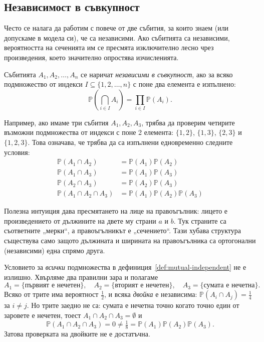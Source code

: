 \subsection{Независимост в съвкупност}

Често се налага да работим с повече от две събития, за които знаем (или допускаме в модела си), че са независими. Ако събитията са независими, вероятността на сеченията им се пресмята изключително лесно чрез произведения, което значително опростява изчисленията.

\begin{defn}\label{def:mutual-independent}
Събитията $A_1, A_2, \dots, A_n$ се наричат \emph{независими в съвкупност}, ако за всяко подмножество от индекси $I \subseteq \{1, 2, \dots, n\}$ с поне два елемента е изпълнено:
\[
\mathbb{P}\left(\bigcap_{i \in I} A_i\right) = \prod_{i \in I} \mathbb{P}(A_i) .
\]
\end{defn}

Например, ако имаме три събития $A_1, A_2, A_3$, трябва да проверим четирите възможни подмножества от индекси с поне 2 елемента: $\{1, 2\}$, $\{1, 3\}$, $\{2, 3\}$ и $\{1, 2, 3\}$. Това означава, че трябва да са изпълнени едновременно следните условия:
\begin{align*}
\mathbb{P}(A_1 \cap A_2) &= \mathbb{P}(A_1)\mathbb{P}(A_2) \\
\mathbb{P}(A_1 \cap A_3) &= \mathbb{P}(A_1)\mathbb{P}(A_3) \\
\mathbb{P}(A_2 \cap A_3) &= \mathbb{P}(A_2)\mathbb{P}(A_3) \\
\mathbb{P}(A_1 \cap A_2 \cap A_3) &= \mathbb{P}(A_1)\mathbb{P}(A_2)\mathbb{P}(A_3)
\end{align*}

Полезна интуиция дава пресмятането на лице на правоъгълник: лицето е произведението от дължините на двете му страни $a$ и $b$. Тук страните са съответните „мерки“, а правоъгълникът е „сечението“. Тази хубава структура съществува само защото дължината и ширината на правоъгълника са ортогонални (независими) една спрямо друга.

\begin{supp}\label{supp:pairwise}
Условието за \emph{всички} подмножества в дефиниция~\ref{def:mutual-independent} не е
излишно. Хвърляме два правилни зара и полагаме
\[
A_1 = \{\text{първият е нечетен}\}, \quad
A_2 = \{\text{вторият е нечетен}\}, \quad
A_3 = \{\text{сумата е нечетна}\}.
\]
Всяко от трите има вероятност $\tfrac12$, и всяка \emph{двойка} е независима:
$\mathbb{P}(A_i \cap A_j) = \tfrac14$ за $i \neq j$. Но трите заедно не са: сумата е нечетна
точно когато точно един от заровете е нечетен, тоест $A_1 \cap A_2 \cap A_3 = \emptyset$ и
\[
\mathbb{P}(A_1 \cap A_2 \cap A_3) = 0 \neq \tfrac18 = \mathbb{P}(A_1)\mathbb{P}(A_2)\mathbb{P}(A_3).
\]
Затова проверката на двойките не е достатъчна.
\end{supp}

